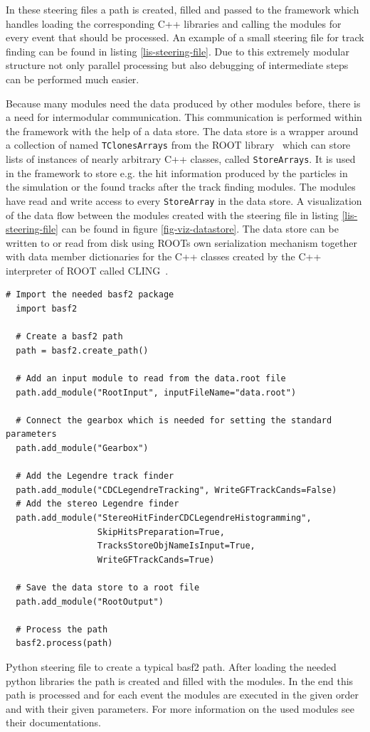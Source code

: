 In these steering files a path is created, filled and passed to the framework which handles loading the corresponding C++ libraries and calling the modules for every event that should be processed. An example of a small steering file for track finding can be found in listing \ref{lis-steering-file}. Due to this extremely modular structure not only parallel processing but also debugging of intermediate steps can be performed much easier.

Because many modules need the data produced by other modules before, there is a need for intermodular communication. This communication is performed within the framework with the help of a data store. The data store is a wrapper around a collection of named \texttt{TClonesArrays} from the ROOT library~\cite{tclonesarray} which can store lists of instances of nearly arbitrary C++ classes, called \texttt{StoreArrays}. It is used in the framework to store e.g. the hit information produced by the particles in the simulation or the found tracks after the track finding modules. The modules have read and write access to every \texttt{StoreArray} in the data store. A visualization of the data flow between the modules created with the steering file in listing \ref{lis-steering-file} can be found in figure \ref{fig-viz-datastore}. The data store can be written to or read from disk using ROOTs own serialization mechanism together with data member dictionaries for the C++ classes created by the C++ interpreter of ROOT called CLING~\cite{cling}.

\begin{listing}
 \begin{lstlisting}[style=customP]
  # Import the needed basf2 package
  import basf2

  # Create a basf2 path
  path = basf2.create_path()

  # Add an input module to read from the data.root file
  path.add_module("RootInput", inputFileName="data.root")
  
  # Connect the gearbox which is needed for setting the standard parameters
  path.add_module("Gearbox")

  # Add the Legendre track finder
  path.add_module("CDCLegendreTracking", WriteGFTrackCands=False)
  # Add the stereo Legendre finder
  path.add_module("StereoHitFinderCDCLegendreHistogramming",
                  SkipHitsPreparation=True,
                  TracksStoreObjNameIsInput=True,
                  WriteGFTrackCands=True)
  
  # Save the data store to a root file
  path.add_module("RootOutput")

  # Process the path
  basf2.process(path)

 \end{lstlisting}
 \caption[Python steering file to create a typical basf2 path.]{Python steering file to create a typical basf2 path. After loading the needed python libraries the path is created and filled with the modules. In the end this path is processed and for each event the modules are executed in the given order and with their given parameters. For more information on the used modules see their documentations.}
 \label{lis-steering-file}
\end{listing}


